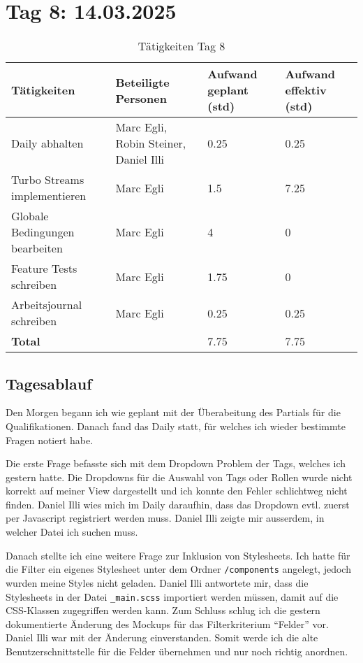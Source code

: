 \section{Tag 8: 14.03.2025}
\begin{table}[H]
    \begin{tabular}{|L{0.4\textwidth}|C{60pt}|C{60pt}|C{60pt}|}
        \hline
        \color{white}Tätigkeiten & \color{white}Beteiligte \color{white}Personen & \color{white}Aufwand geplant (std) & \color{white}Aufwand effektiv (std) \\
        \hline
        Daily abhalten & Marc Egli, Robin Steiner, Daniel Illi & 0.25 & 0.25 \\
        \hline
        Turbo Streams implementieren & Marc Egli & 1.5 & 7.25 \\
        \hline
        Globale Bedingungen bearbeiten & Marc Egli & 4 & 0 \\
        \hline
        Feature Tests schreiben & Marc Egli & 1.75 & 0 \\
        \hline
        Arbeitsjournal schreiben & Marc Egli & 0.25 & 0.25 \\
        \hline
        \textbf{Total} &  & 7.75 & 7.75 \\
        \hline
    \end{tabular}
    \caption{Tätigkeiten Tag 8}
\end{table}

\subsection*{Tagesablauf}
Den Morgen begann ich wie geplant mit der Überabeitung des Partials für die Qualifikationen. Danach fand das Daily statt, für welches ich wieder
bestimmte Fragen notiert habe.

Die erste Frage befasste sich mit dem Dropdown Problem der Tags, welches ich gestern hatte. Die Dropdowns für die Auswahl von Tags oder Rollen wurde nicht korrekt
auf meiner View dargestellt und ich konnte den Fehler schlichtweg nicht finden. Daniel Illi wies mich im Daily daraufhin, dass
das Dropdown evtl. zuerst per Javascript registriert werden muss. Daniel Illi zeigte mir ausserdem, in welcher Datei ich suchen muss.

Danach stellte ich eine weitere Frage zur Inklusion von Stylesheets. Ich hatte für die Filter ein eigenes Stylesheet unter dem Ordner \texttt{/components}
angelegt, jedoch wurden meine Styles nicht geladen. Daniel Illi antwortete mir, dass die Stylesheets in der Datei \texttt{\_main.scss} importiert werden müssen,
damit auf die CSS-Klassen zugegriffen werden kann. Zum Schluss schlug ich die gestern dokumentierte Änderung des Mockups für das Filterkriterium ``Felder'' vor.
Daniel Illi war mit der Änderung einverstanden. Somit werde ich die alte Benutzerschnittstelle für die Felder übernehmen und nur noch richtig anordnen.

